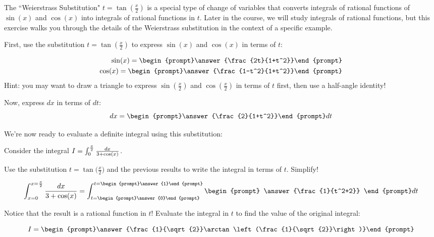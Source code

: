 \documentclass{ximera}
\author{Jim Talamo}
\begin{document}
The ``Weierstrass Substitution" $t= \tan\left(\frac{x}{2}\right)$ is a special type of change of variables that converts integrals of rational functions of $\sin(x)$ and $\cos(x)$ into integrals of rational functions in $t$.  Later in the course, we will study integrals of rational functions, but this exercise walks you through the details of the Weierstrass substitution in the context of a specific example.

\begin{exercise}

First, use the substitution $t= \tan\left(\frac{x}{2}\right)$ to express $\sin(x)$ and $\cos(x)$ in terms of $t$:

\begin{align*}
\sin(x) = \begin{prompt}\answer{\frac{2t}{1+t^2}}\end{prompt}\\
\cos(x) = \begin{prompt}\answer{\frac{1-t^2}{1+t^2}}\end{prompt}
\end{align*}
Hint: you may want to draw a triangle to express $\sin\left(\frac{x}{2}\right)$ and $\cos\left(\frac{x}{2}\right)$ in terms of $t$ first, then use a half-angle identity!

Now, express $dx$ in terms of $dt$:
\[dx = \begin{prompt}\answer{\frac{2}{1+t^2}}\end{prompt} dt \]
\end{exercise}

We're now ready to evaluate a definite integral using this substitution:
\begin{exercise}
Consider the integral $I = \int_0^{\frac{\pi}{2}} \frac{\mathop{}\!d x}{3+\cos(x)}$.  

Use the substitution $t= \tan\bigg(\frac{x}{2}\bigg)$ and the previous results to write the integral in terms of $t$.  Simplify!

\[ \int_{x=0}^{x= \frac{\pi}{2}} \frac{\d x}{3+\cos(x)}  = \int_{t=\begin{prompt}\answer{0}\end{prompt}}^{t=\begin{prompt}\answer{1}\end{prompt}} \begin{prompt} \answer{\frac{1}{t^2+2}} \end{prompt} dt \]

Notice that the result is a rational function in $t$!  Evaluate the integral in $t$ to find the value of the original integral:

\[ I = \begin{prompt}\answer{\frac{1}{\sqrt{2}}\arctan\left(\frac{1}{\sqrt{2}}\right)}\end{prompt} \]
\end{exercise}
\end{document}
